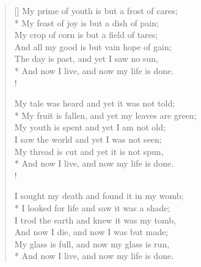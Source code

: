 \documentclass[MAIN]{subfiles}
\begin{document}
\settowidth{\versewidth}{My prime of youth is but a frost of cares;}
\begin{verse}[\versewidth]
My prime of youth is but a frost of cares;\\*
\vin My feast of joy is but a dish of pain;\\
My crop of corn is but a field of tares;\\
\vin And all my good is but vain hope of gain;\\
The day is past, and yet I saw no sun,\\*
And now I live, and now my life is done.\\!

My tale was heard and yet it was not told;\\*
\vin My fruit is fallen, and yet my leaves are green;\\
My youth is spent and yet I am not old;\\
\vin I saw the world and yet I was not seen;\\
My thread is cut and yet it is not spun,\\*
And now I live, and now my life is done.\\!

I sought my death and found it in my womb;\\*
\vin I looked for life and saw it was a shade;\\
I trod the earth and knew it was my tomb,\\
\vin And now I die, and now I was but made;\\
My glass is full, and now my glass is run,\\*
And now I live, and now my life is done.
\end{verse}
\end{document}
